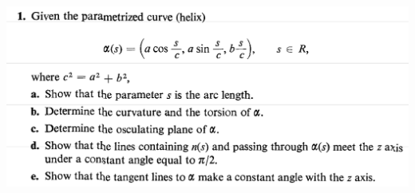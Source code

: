 \documentclass{report}
\begin{document}
\begin{question}{}{}
\includegraphics[height=10cm,width=18cm]{hw2q5}
\end{question}
\end{document}
